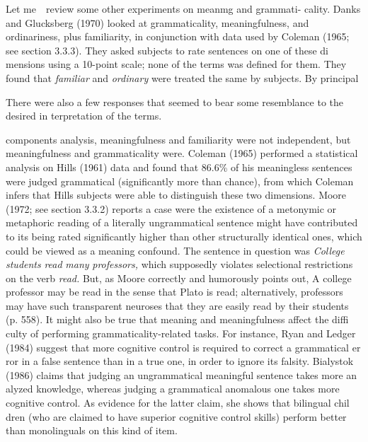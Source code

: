 \begin{styleTextbody}
Let me\ \ review some other experiments on meanmg and grammati- cality. Danks and Glucksberg (1970) looked at grammaticality, meaningfulness, and ordinariness, plus familiarity, in conjunction with data used by Coleman (1965; see section 3.3.3). They asked subjects to rate sentences on one of these di\- mensions using a 10-point scale; none of the terms was defined for them. They found that \textit{familiar}\textit{ }and \textit{ordinary}\textit{ }were treated the same by subjects. By principal
\end{styleTextbody}


\begin{listWWNumxxxiileveli}
\item 
\begin{styleStandard}
There were also a few responses that seemed to bear some resemblance to the desired in\- terpretation of the terms.
\end{styleStandard}


\end{listWWNumxxxiileveli}
\clearpage\setcounter{page}{1}\begin{styleTextbody}
components analysis, meaningfulness and familiarity were not independent, but meaningfulness and grammaticality were. Coleman (1965) performed a statistical analysis on Hill{\textquotesingle}s (1961) data and found that 86.6\% of his meaningless sentences were judged grammatical (significantly more than chance), from which Coleman infers that Hill{\textquotesingle}s subjects were able to distinguish these two dimensions. Moore (1972; see section 3.3.2) reports a case were the existence of a metonymic or metaphoric reading of a literally ungrammatical sentence might have contributed to its being rated significantly higher than other structurally identical ones, which could be viewed as a meaning confound. The sentence in question was \textit{College students}\textit{ }\textit{read}\textit{ }\textit{many}\textit{ }\textit{professors,}\textit{ }which supposedly violates selectional restrictions on the verb \textit{read.}\textit{ }But, as Moore correctly and humorously points out, {\textquotedbl}A college professor may be read in the sense that Plato is read; alternatively, professors may have such transparent neuroses that they are easily {\textquotesingle}read{\textquotesingle} by their students{\textquotedbl} (p. 558). It might also be true that meaning and meaningfulness affect the diffi\- culty of performing grammaticality-related tasks. For instance, Ryan and Ledger (1984) suggest that more cognitive control is required to correct a grammatical er\- ror in a false sentence than in a true one, in order to ignore its falsity. Bialystok (1986) claims that judging an ungrammatical meaningful sentence takes more an\- alyzed knowledge, whereas judging a grammatical anomalous one takes more cognitive control. As evidence for the latter claim, she shows that bilingual chil\- dren (who are claimed to have superior cognitive control skills) perform better than monolinguals on this kind of item.
\end{styleTextbody}


